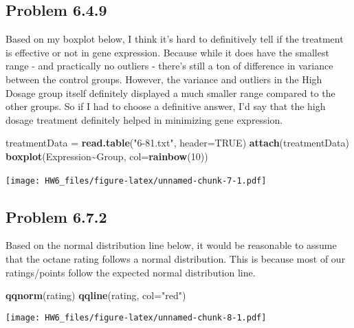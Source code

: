 \documentclass[
]{article}
\newenvironment{Shaded}{\begin{snugshade}}{\end{snugshade}}
\newcommand{\AttributeTok}[1]{\textcolor[rgb]{0.13,0.29,0.53}{#1}}
\newcommand{\ConstantTok}[1]{\textcolor[rgb]{0.56,0.35,0.01}{#1}}
\newcommand{\DecValTok}[1]{\textcolor[rgb]{0.00,0.00,0.81}{#1}}
\newcommand{\FunctionTok}[1]{\textcolor[rgb]{0.13,0.29,0.53}{\textbf{#1}}}
\newcommand{\NormalTok}[1]{#1}
\newcommand{\OtherTok}[1]{\textcolor[rgb]{0.56,0.35,0.01}{#1}}
\newcommand{\SpecialCharTok}[1]{\textcolor[rgb]{0.81,0.36,0.00}{\textbf{#1}}}
\newcommand{\StringTok}[1]{\textcolor[rgb]{0.31,0.60,0.02}{#1}}
\begin{document}
\(~\)

\pagebreak

\subsection{Problem 6.4.9}\label{problem-6.4.9}

Based on my boxplot below, I think it's hard to definitively tell if the
treatment is effective or not in gene expression. Because while it does
have the smallest range - and practically no outliers - there's still a
ton of difference in variance between the control groups. However, the
variance and outliers in the High Dosage group itself definitely
displayed a much smaller range compared to the other groups. So if I had
to choose a definitive answer, I'd say that the high dosage treatment
definitely helped in minimizing gene expression.

\begin{Shaded}
\begin{Highlighting}[]
\NormalTok{treatmentData }\OtherTok{=} \FunctionTok{read.table}\NormalTok{(}\StringTok{"6{-}81.txt"}\NormalTok{, }\AttributeTok{header=}\ConstantTok{TRUE}\NormalTok{)}
\FunctionTok{attach}\NormalTok{(treatmentData)}
\FunctionTok{boxplot}\NormalTok{(Expression}\SpecialCharTok{\textasciitilde{}}\NormalTok{Group, }\AttributeTok{col=}\FunctionTok{rainbow}\NormalTok{(}\DecValTok{10}\NormalTok{))}
\end{Highlighting}
\end{Shaded}

\texttt{[image: HW6\_files/figure-latex/unnamed-chunk-7-1.pdf]} \(~\)

\pagebreak

\subsection{Problem 6.7.2}\label{problem-6.7.2}

Based on the normal distribution line below, it would be reasonable to
assume that the octane rating follows a normal distribution. This is
because most of our ratings/points follow the expected normal
distribution line.

\begin{Shaded}
\begin{Highlighting}[]
\FunctionTok{qqnorm}\NormalTok{(rating)}
\FunctionTok{qqline}\NormalTok{(rating, }\AttributeTok{col=}\StringTok{"red"}\NormalTok{)}
\end{Highlighting}
\end{Shaded}

\texttt{[image: HW6\_files/figure-latex/unnamed-chunk-8-1.pdf]}
\end{document}
